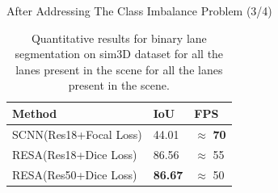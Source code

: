 \documentclass[aspectratio=169]{beamer}
\begin{document}
\begin{frame}{After Addressing The Class Imbalance Problem (3/4)}
 \begin{table}[h]
    \caption{Quantitative results for binary lane segmentation on sim3D dataset for all the lanes present in the scene for all the lanes present in the scene.}
    \centering
    \begin{tabular}{|l|l|l|}
    \hline
        \textbf{Method} & \textbf{IoU} & \textbf{FPS} \\ \hline
        SCNN(Res18+Focal Loss)& 44.01 & $\approx$ \textbf{70} \\\hline
        RESA(Res18+Dice Loss) & 86.56 & $\approx$ 55 \\\hline
        RESA(Res50+Dice Loss) & \textbf{86.67} & $\approx$ 50 \\\hline
    \end{tabular}
\end{table}
    
\end{frame}
\end{document}
